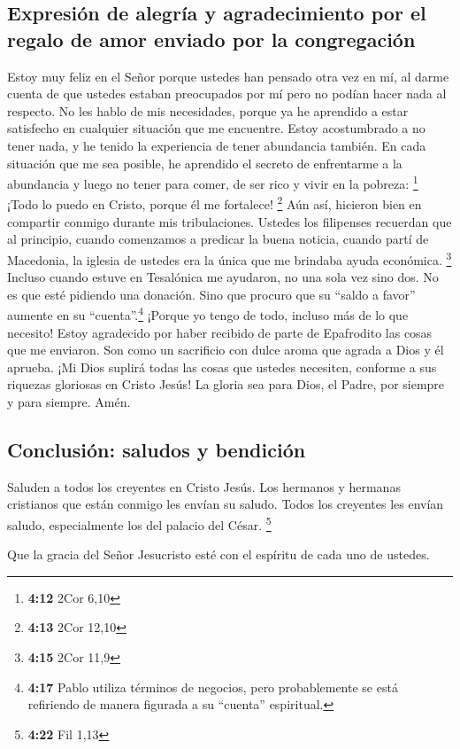 \hypertarget{expresiuxf3n-de-alegruxeda-y-agradecimiento-por-el-regalo-de-amor-enviado-por-la-congregaciuxf3n}{%
\subsection{Expresión de alegría y agradecimiento por el regalo de amor
enviado por la
congregación}\label{expresiuxf3n-de-alegruxeda-y-agradecimiento-por-el-regalo-de-amor-enviado-por-la-congregaciuxf3n}}

 Estoy muy feliz en el Señor porque ustedes han pensado
otra vez en mí, al darme cuenta de que ustedes estaban preocupados por
mí pero no podían hacer nada al respecto.  No les hablo
de mis necesidades, porque ya he aprendido a estar satisfecho en
cualquier situación que me encuentre.  Estoy acostumbrado
a no tener nada, y he tenido la experiencia de tener abundancia también.
En cada situación que me sea posible, he aprendido el secreto de
enfrentarme a la abundancia y luego no tener para comer, de ser rico y
vivir en la pobreza: \footnote{\textbf{4:12} 2Cor 6,10} 
¡Todo lo puedo en Cristo, porque él me fortalece! \footnote{\textbf{4:13}
  2Cor 12,10}  Aún así, hicieron bien en compartir
conmigo durante mis tribulaciones.  Ustedes los
filipenses recuerdan que al principio, cuando comenzamos a predicar la
buena noticia, cuando partí de Macedonia, la iglesia de ustedes era la
única que me brindaba ayuda económica. \footnote{\textbf{4:15} 2Cor 11,9}
 Incluso cuando estuve en Tesalónica me ayudaron, no una
sola vez sino dos.  No es que esté pidiendo una donación.
Sino que procuro que su ``saldo a favor'' aumente en su
``cuenta''.\footnote{\textbf{4:17} Pablo utiliza términos de negocios,
  pero probablemente se está refiriendo de manera figurada a su
  ``cuenta'' espiritual.}  ¡Porque yo tengo de todo,
incluso más de lo que necesito! Estoy agradecido por haber recibido de
parte de Epafrodito las cosas que me enviaron. Son como un sacrificio
con dulce aroma que agrada a Dios y él aprueba.  ¡Mi Dios
suplirá todas las cosas que ustedes necesiten, conforme a sus riquezas
gloriosas en Cristo Jesús!  La gloria sea para Dios, el
Padre, por siempre y para siempre. Amén.

\hypertarget{conclusiuxf3n-saludos-y-bendiciuxf3n}{%
\subsection{Conclusión: saludos y
bendición}\label{conclusiuxf3n-saludos-y-bendiciuxf3n}}

 Saluden a todos los creyentes en Cristo Jesús. Los
hermanos y hermanas cristianos que están conmigo les envían su saludo.
 Todos los creyentes les envían saludo, especialmente los
del palacio del César. \footnote{\textbf{4:22} Fil 1,13}

 Que la gracia del Señor Jesucristo esté con el espíritu
de cada uno de ustedes.
